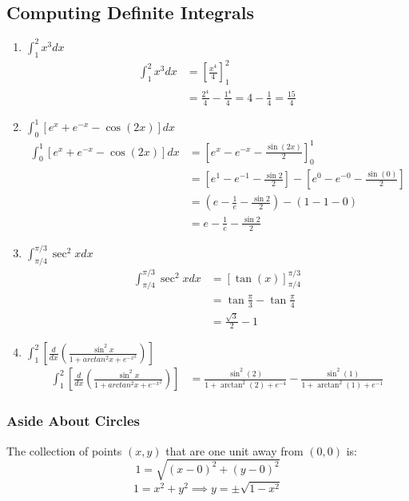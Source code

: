 \documentclass{article}
\begin{document}
\subsection{Computing Definite Integrals}
\begin{enumerate}
    \item $\int_1^2 x^3 dx$
    \begin{align*}
        \int_1^2 x^3 dx & = \left[ \frac{x^4}{4} \right]_1^2\\
        & = \frac{2^4}{4} - \frac{1^4}{4} = 4 - \frac{1}{4} = \frac{15}{4}
    \end{align*}
    
    \item $\int_0^1 \left[ e^x + e^{-x} - \cos(2x)\right] dx$
    \begin{align*}
        \int_0^1 \left[ e^x + e^{-x} - \cos(2x)\right] dx & = \left[ e^x - e^{-x} - \frac{\sin(2x)}{2}\right]_0^1\\
        & = \left[ e^1 - e^{-1} - \frac{\sin 2}{2}\right] - \left[ e^0 - e^{-0} - \frac{\sin(0)}{2}\right]\\
        & = (e - \frac{1}{e} - \frac{\sin 2}{2}) - (1 - 1 - 0)\\
        & = e - \frac{1}{e} - \frac{\sin 2}{2}
    \end{align*}
    
    \item $\int_{\pi/4}^{\pi/3}\sec^2x dx$
    \begin{align*}
        \int_{\pi/4}^{\pi/3}\sec^2x dx & = [\tan(x)]_{\pi/4}^{\pi/3}\\
        & = \tan\frac{\pi}{3} - \tan\frac{\pi}{4}\\
        & = \frac{\sqrt{3}}{2} - 1
    \end{align*}
    
    \item $\int_1^2 \left[\frac{d}{dx}(\frac{\sin^2x}{1 + arctan^2x + e^{-x^2}})\right]$
    \begin{align*}
        \int_1^2 \left[\frac{d}{dx}(\frac{\sin^2x}{1 + arctan^2x + e^{-x^2}})\right] & = \frac{\sin^2(2)}{1 + \arctan^2(2)+e^{-4}} - \frac{\sin^2(1)}{1 + \arctan^2(1) + e^{-1}}
    \end{align*}
\end{enumerate}


\subsubsection{Aside About Circles}
The collection of points $(x,y)$ that are one unit away from $(0,0)$ is:
$$1 = \sqrt{(x-0)^2 + (y-0)^2}$$
$$1 = x^2 + y^2 \implies y = \pm \sqrt{1-x^2}$$
\end{document}
